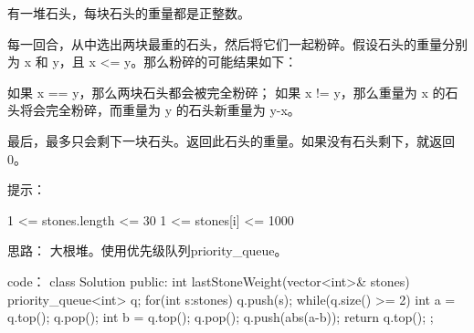 有一堆石头，每块石头的重量都是正整数。

每一回合，从中选出两块最重的石头，然后将它们一起粉碎。假设石头的重量分别为 x 和 y，且 x <= y。那么粉碎的可能结果如下：

    如果 x == y，那么两块石头都会被完全粉碎；
    如果 x != y，那么重量为 x 的石头将会完全粉碎，而重量为 y 的石头新重量为 y-x。

最后，最多只会剩下一块石头。返回此石头的重量。如果没有石头剩下，就返回 0。

 

提示：

    1 <= stones.length <= 30
    1 <= stones[i] <= 1000






























思路：
大根堆。使用优先级队列priority_queue。






























code：
class Solution {
public:
    int lastStoneWeight(vector<int>& stones) {
        priority_queue<int> q;
        for(int s:stones)
            q.push(s);
        while(q.size() >= 2)
        {
            int a = q.top(); q.pop();
            int b = q.top(); q.pop();
            q.push(abs(a-b));
        }
        return q.top();
    }
};